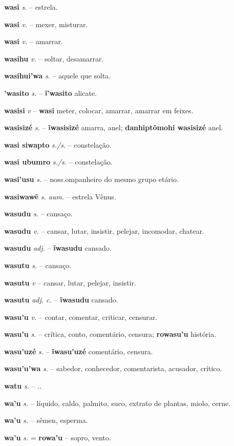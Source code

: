 \textbf{wasi} \textit{s.} -- estrela.

\textbf{wasi} \textit{v.} -- mexer, misturar.

\textbf{wasi} \textit{v.} -- amarrar.

\textbf{wasihu} \textit{v.} -- soltar, desamarrar.

\textbf{wasihui'wa} \textit{s.} -- aquele que solta.

\textbf{'wasito} \textit{s.} -- \textbf{ĩ'wasito} alicate.

\textbf{wasisi} \textit{v} -- \textbf{wasi} meter, colocar, amarrar, amarrar em feixes.

\textbf{wasisizé} \textit{s.} -- \textbf{ĩwasisizé} amarra, anel; \textbf{danhiptõmohi wasisizé} anel.

\textbf{wasi siwapto} \textit{s./s.} -- constelação.

\textbf{wasi ubumro} \textit{s./s.} -- constelação.

\textbf{wasi'usu} \textit{s.} -- noss.ompanheiro do mesmo grupo etário.

\textbf{wasiwawẽ} \textit{s. aum.} -- estrela Vênus.

\textbf{wasudu} \textit{s.} -- cansaço.

\textbf{wasudu} \textit{v.} -- cansar, lutar, insistir, pelejar, incomodar, chatear.

\textbf{wasudu} \textit{adj.} -- \textbf{ĩwasudu} cansado.

\textbf{wasutu} \textit{s.} -- cansaço.

\textbf{wasutu} \textit{v} -- cansar, lutar, pelejar, insistir.

\textbf{wasutu} \textit{adj. c.} -- \textbf{ĩwasudu} cansado.

\textbf{wasu'u} \textit{v.} -- contar, comentar, criticar, censurar.

\textbf{wasu'u} \textit{s.} -- crítica, conto, comentário, censura; \textbf{rowasu'u} história.

\textbf{wasu'uzé} \textit{s.} -- \textbf{ĩwasu'uzé} comentário, censura.

\textbf{wasu'u'wa} \textit{s.} -- sabedor, conhecedor, comentarista, acusador, crítico.

\textbf{watu} \textit{s.} -- ..


\textbf{wa'u} \textit{s.} -- líquido, caldo, palmito, suco, extrato de plantas, miolo, cerne.

\textbf{wa'u} \textit{s.} -- sêmen, esperma.

\textbf{wa'u} \textit{s.} = \textbf{rowa'u} -- sopro, vento.

